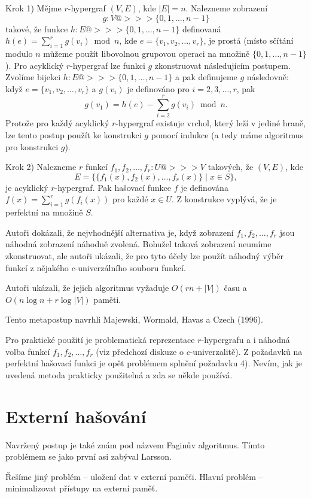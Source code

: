 \documentclass[a4paper,12pt]{article}
\begin{document}
Krok 1) Mějme $r$-hypergraf $(V,E)$, kde $|E|=n$.  Nalezneme 
zobrazení 
$$g:V@>>>\{0,1,\dots,n-1\}$$
takové, že funkce 
$h:E@>>>\{0,1,\dots,n-1\}$ definovaná $h(e)=\sum_{i=1}^rg(v_i)\bmod 
n$, 
kde $e=\{v_1,v_2,\dots,v_r\}$, je prostá (místo sčítání modulo $
n$ 
můžeme použít libovolnou grupovou operaci na 
množině $\{0,1,\dots,n-1\}$).  Pro acyklický $r$-hypergraf lze 
funkci $g$ zkonstruovat násle\-dujícím postupem.  Zvolíme 
bijekci $h:E@>>>\{0,1,\dots,n-1\}$ a pak definujeme $g$ 
následovně:  když $e=\{v_1,v_2,\dots,v_r\}$ a $g(v_i)$ je 
definováno pro $i=2,3,\dots,r$, pak 
$$g(v_1)=h(e)-\sum_{i=2}^rg(v_i)\bmod n.$$
Protože pro každý acyklický $r$-hypergraf existuje vrchol, který 
leží v jediné hraně, lze tento postup použít ke konstrukci $
g$ 
pomocí indukce (a tedy máme algoritmus pro konstrukci $g$).  

Krok 2) Nalezneme $r$ funkcí $f_1,f_2,\dots,f_r:U@>>>
V$ takových, že 
$(V,E)$, kde 
$$E=\{\{f_1(x),f_2(x),\dots,f_r(x)\}\mid x\in S\},$$
 je acyklický 
$r$-hypergraf.  Pak hašovací funkce $f$ je definována 
$f(x)=\sum_{i=1}^rg(f_i(x))$ pro každé $x\in U$.  Z konstrukce 
vyplývá, že je perfektní na množině $S$.  

Autoři dokázali, že 
nejvhodnější alternativa je, když zobrazení $f_1
,f_2,\dots,f_r$ 
jsou náhodná zob\-razení náhodně zvolená. Bohu\-žel taková 
zobrazení neumíme zkonstruovat, ale autoři ukázali, že 
pro tyto účely lze použít náhodný výběr funkcí z 
nějakého $c$-univerzálního souboru funk\-cí. 

Autoři ukázali, že jejich algoritmus vyžaduje $
O(rn+|V|)$ 
času a $O(n\log n+r\log|V|)$ paměti. 

Tento metapostup navrhli Majewski, Wormald, Havas a Czech (1996).

Pro praktické použití je problematická 
reprezentace $r$-hyper\-gra\-fu a i náhodná volba funkcí 
$f_1,f_2,\dots,f_r$ (viz předchozí diskuze o $c$-univerzalitě).  Z 
požadavků na perfektní hašovací funkci je opět 
problémem splnění poža\-davku 4).  Nevím, jak je uvedená 
metoda prakticky pou\-ži\-telná a zda se někde používá.  

\section{Externí hašování}

Navržený postup je také znám pod názvem Faginův algoritmus. Tímto problémem se jako první asi zabýval Larsson.

Řešíme jiný problém -- uložení dat v externí 
paměťi. Hlavní problém -- minimalizovat přístupy na 
externí paměť. 
\end{document}
